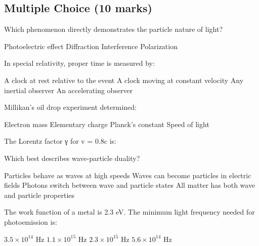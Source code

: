 \documentclass[addpoints]{exam}
\begin{document}
\newpage

\begin{questions}


\section*{Multiple Choice (10 marks)}
\vspace{5mm}

\question[1] Which phenomenon directly demonstrates the particle nature of light?
\begin{choices}
    \correctchoice Photoelectric effect
    \choice Diffraction
    \choice Interference
    \choice Polarization
\end{choices}

\question[1] In special relativity, proper time is measured by:
\begin{choices}
    \correctchoice A clock at rest relative to the event
    \choice A clock moving at constant velocity
    \choice Any inertial observer
    \choice An accelerating observer
\end{choices}

\question[1] Millikan's oil drop experiment determined:
\begin{choices}
    \choice Electron mass
    \correctchoice Elementary charge
    \choice Planck's constant
    \choice Speed of light
\end{choices}

\question[1] The Lorentz factor γ for v = 0.8c is:
\begin{choices}
\end{choices}

\question[1] Which best describes wave-particle duality?
\begin{choices}
    \choice Particles behave as waves at high speeds
    \choice Waves can become particles in electric fields
    \choice Photons switch between wave and particle states
    \correctchoice All matter has both wave and particle properties
\end{choices}

\question[1] The work function of a metal is 2.3 eV. The minimum light frequency needed for photoemission is:
\begin{choices}
    \choice $3.5 \times 10^{14}$ Hz
    \choice $1.1 \times 10^{15}$ Hz
    \choice $2.3 \times 10^{15}$ Hz
    \correctchoice $5.6 \times 10^{14}$ Hz
\end{choices}


\end{questions}
\end{document}
